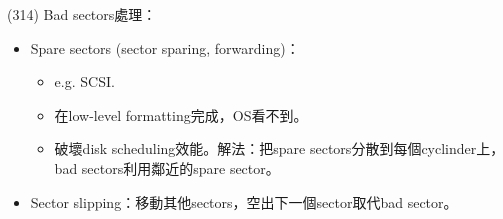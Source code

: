 \begin{theorem}{(314)} Bad sectors處理：\begin{itemize}
        \item Spare sectors (sector sparing, forwarding)：\begin{itemize}
            \item e.g. SCSI.
            \item 在low-level formatting完成，OS看不到。
            \item 破壞disk scheduling效能。解法：把spare sectors分散到每個cyclinder上，bad sectors利用鄰近的spare sector。
        \end{itemize}
        \item Sector slipping：移動其他sectors，空出下一個sector取代bad sector。
    \end{itemize}
\end{theorem}
